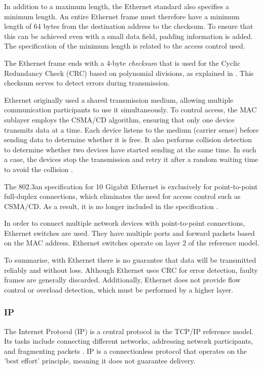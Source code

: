 In addition to a maximum length, the Ethernet standard also specifies a minimum length. An entire Ethernet frame must therefore have a minimum length of 64 bytes from the destination address to the checksum. To ensure that this can be achieved even with a small data field, padding information is added. The specification of the minimum length is related to the access control used.

The Ethernet frame ends with a 4-byte \textit{checksum} that is used for the Cyclic Redundancy Check (CRC) based on polynomial divisions, as explained in \cite{Tanenbaum2010}.  This checksum serves to detect errors during transmission.

Ethernet originally used a shared transmission medium, allowing multiple communication participants to use it simultaneously. To control access, the MAC sublayer employs the CSMA/CD algorithm, ensuring that only one device transmits data at a time. Each device listens to the medium (carrier sense) before sending data to determine whether it is free. It also performs collision detection to determine whether two devices have started sending at the same time. In such a case, the devices stop the transmission and retry it after a random waiting time to avoid the collision \cite{Tanenbaum2010}.

The 802.3an specification for 10 Gigabit Ethernet is exclusively for point-to-point full-duplex connections, which eliminates the need for access control such as CSMA/CD. As a result, it is no longer included in the specification \cite{10GbEDefinition}.

In order to connect multiple network devices with point-to-point connections, Ethernet switches are used. They have multiple ports and forward packets based on the MAC address. Ethernet switches operate on layer 2 of the reference model.

To summarise, with Ethernet there is no guarantee that data will be transmitted reliably and without loss. Although Ethernet uses CRC for error detection, faulty frames are generally discarded. Additionally, Ethernet does not provide flow control or overload detection, which must be performed by a higher layer.


\subsubsection{IP}

The Internet Protocol (IP) is a central protocol in the TCP/IP reference model. Its tasks include connecting different networks, addressing network participants, and fragmenting packets \cite{Weigel2021}. IP is a connectionless protocol that operates on the 'best effort' principle, meaning it does not guarantee delivery.

